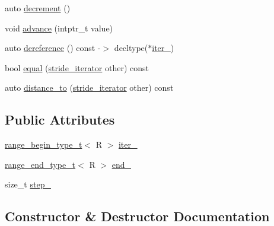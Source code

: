 \begin{DoxyCompactItemize}
\item 
auto \mbox{\hyperlink{structrah_1_1view_1_1stride__iterator_a8104aed5699a5f26626c8a010a97f5f4}{decrement}} ()
\item 
void \mbox{\hyperlink{structrah_1_1view_1_1stride__iterator_aede4ba99f4ede1afdad678bd0dba4f7b}{advance}} (intptr\+\_\+t value)
\item 
auto \mbox{\hyperlink{structrah_1_1view_1_1stride__iterator_a8db124e5f1f4260387c40336712b1566}{dereference}} () const -\/$>$ decltype($\ast$\mbox{\hyperlink{structrah_1_1view_1_1stride__iterator_ab6d43c096bd4561c737cb7f2b983afb3}{iter\+\_\+}})
\item 
bool \mbox{\hyperlink{structrah_1_1view_1_1stride__iterator_a34c24e935ee7beebcd7269ee314e245a}{equal}} (\mbox{\hyperlink{structrah_1_1view_1_1stride__iterator}{stride\+\_\+iterator}} other) const
\item 
auto \mbox{\hyperlink{structrah_1_1view_1_1stride__iterator_ad30be3983aec3fab52efb32a1a461056}{distance\+\_\+to}} (\mbox{\hyperlink{structrah_1_1view_1_1stride__iterator}{stride\+\_\+iterator}} other) const
\end{DoxyCompactItemize}
\subsection*{Public Attributes}
\begin{DoxyCompactItemize}
\item 
\mbox{\hyperlink{namespacerah_a28aff4eeddcece6be65ff0b956d32d4a}{range\+\_\+begin\+\_\+type\+\_\+t}}$<$ R $>$ \mbox{\hyperlink{structrah_1_1view_1_1stride__iterator_ab6d43c096bd4561c737cb7f2b983afb3}{iter\+\_\+}}
\item 
\mbox{\hyperlink{namespacerah_a9657e24ae477f4482225b133fe286b65}{range\+\_\+end\+\_\+type\+\_\+t}}$<$ R $>$ \mbox{\hyperlink{structrah_1_1view_1_1stride__iterator_afa089e27a8e95e132f848a5854d2eced}{end\+\_\+}}
\item 
size\+\_\+t \mbox{\hyperlink{structrah_1_1view_1_1stride__iterator_a1b2e6cfb0631cde24284f56b17a4452c}{step\+\_\+}}
\end{DoxyCompactItemize}


\subsection{Constructor \& Destructor Documentation}
\mbox{\label{structrah_1_1view_1_1stride__iterator_a47ddd2ce0f295fa825919f04431d64a9}} 
